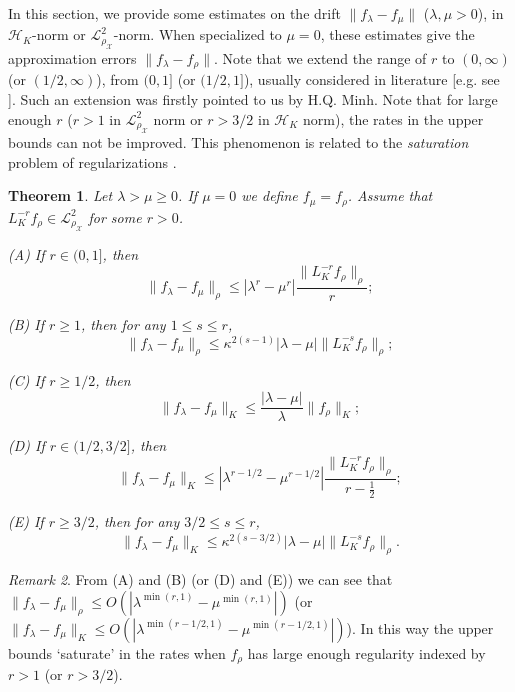 \documentclass[twoside,11pt]{amsart}
\theoremstyle{theorem}
\newtheorem{thm}{Theorem}[section]
\theoremstyle{definition}
\theoremstyle{remark}
\newtheorem{rem}[thm]{Remark}
\def\L{{\mathscr L}}
\def\L2{{\mathscr L}^2_{\rho_\X}}
\def\H{{\mathscr H}}
\def\X{{\mathscr X}}
\def\la{\lambda}
\begin{document}
In this section, we provide some estimates on the drift $\|f_\la - f_\mu\|$ ($\la,\mu>0$), in $\H_K$-norm or $\L2$-norm.
When specialized to $\mu=0$, these estimates give the approximation errors $\|f_\la-f_\rho\|$. 
Note that we extend the range of $r$ to $(0,\infty)$ (or $(1/2,\infty)$), from $(0,1]$ (or $(1/2,1]$), 
usually considered in literature [e.g. see ]. Such an extension was firstly pointed to us by H.Q. Minh. 
Note that for large enough $r$ ($r>1$ in $\L2$ norm or $r>3/2$ in $\H_K$ norm), the rates in the upper bounds can not be improved. 
This phenomenon is related to the \emph{saturation} problem of regularizations \cite{EngHanNeu00}. 

\begin{thm} \label{thm:pie1} Let $\lambda>\mu\geq 0$. If $\mu=0$ we define $f_\mu=f_\rho$. Assume that $L_K^{-r}f_\rho\in \L2$ for
some $r>0$. 

(A) If $r\in (0,1]$, then
\[ \|f_\lambda-f_\mu\|_\rho \leq  |\lambda^r - \mu^r| \frac{\|L_K^{-r} f_\rho\|_\rho}{r}; \]

(B) If $r\geq 1$, then for any $1\leq s \leq r$, 
\[ \|f_\lambda-f_\mu\|_\rho \leq  \kappa^{2(s-1)} |\lambda - \mu| \|L_K^{-s} f_\rho\|_\rho; \]

(C) If $r\geq 1/2$, then
\[ \|f_\lambda - f_\mu \|_K \leq \frac{|\la - \mu|}{\la} \|f_\rho\|_K; \]

(D) If $r\in (1/2,3/2]$, then 
\[ \|f_\lambda-f_\mu\|_K \leq  |\lambda^{r-1/2} - \mu^{r-1/2}| \frac{\|L_K^{-r} f_\rho\|_\rho}{r-\frac{1}{2}}; \]

(E) If $r\geq 3/2$, then for any $3/2\leq s \leq r$,
\[ \|f_\lambda-f_\mu\|_K \leq  \kappa^{2(s-3/2)} |\lambda - \mu| \|L_K^{-s} f_\rho\|_\rho. \]
\end{thm}

\begin{rem}
From (A) and (B) (or (D) and (E)) we can see that $\|f_\la - f_\mu\|_\rho\leq O(|\la^{\min(r,1)}-\mu^{\min(r,1)}|)$ 
(or $\|f_\la - f_\mu\|_K\leq O(|\la^{\min(r-1/2,1)}-\mu^{\min(r-1/2,1)}|)$). In this way the upper bounds `saturate' in the rates
when $f_\rho$ has large enough regularity indexed by $r>1$ (or $r>3/2$). 
\end{rem}
\end{document}
